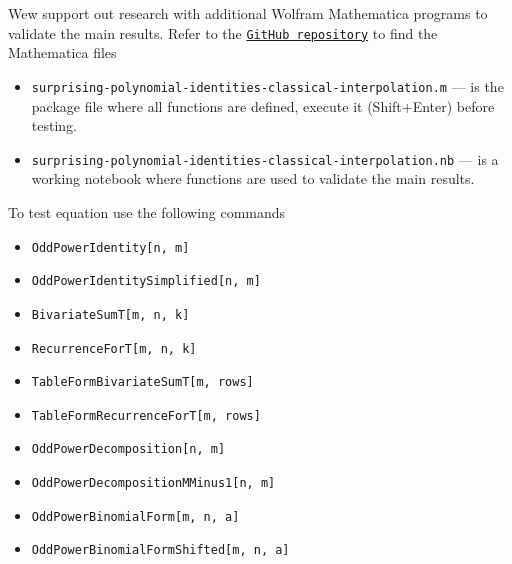 Wew support out research with additional Wolfram Mathematica programs to validate
the main results.
Refer to the
\href{https://github.com/kolosovpetro/surprising-polynomial-identities-classical-interpolation}
{\texttt{GitHub repository}} to find the Mathematica files
\begin{itemize}
    \item \texttt{surprising-polynomial-identities-classical-interpolation.m} --- is the package file
    where all functions are defined, execute it (Shift+Enter) before testing.
    \item \texttt{surprising-polynomial-identities-classical-interpolation.nb} --- is a working notebook
    where functions are used to validate the main results.
\end{itemize}
To test equation use the following commands
\begin{itemize}
    \item \texttt{OddPowerIdentity[n, m]}
    \item \texttt{OddPowerIdentitySimplified[n, m]}
    \item \texttt{BivariateSumT[m, n, k]}
    \item \texttt{RecurrenceForT[m, n, k]}
    \item \texttt{TableFormBivariateSumT[m, rows]}
    \item \texttt{TableFormRecurrenceForT[m, rows]}
    \item \texttt{OddPowerDecomposition[n, m]}
    \item \texttt{OddPowerDecompositionMMinus1[n, m]}
    \item \texttt{OddPowerBinomialForm[m, n, a]}
    \item \texttt{OddPowerBinomialFormShifted[m, n, a]}
\end{itemize}
